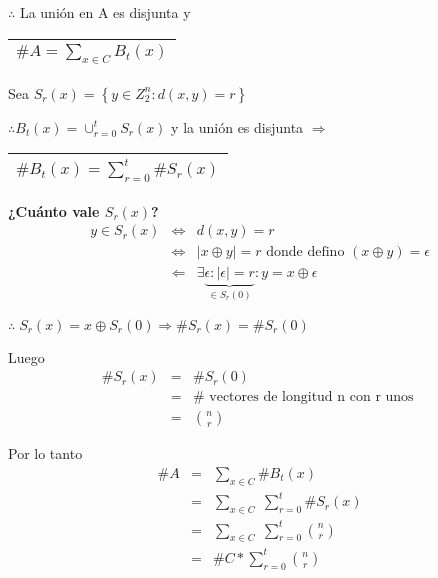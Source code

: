 \documentclass[12pt,a4paper]{report}
\begin{document}
			\begin{center}
				$\therefore$ La unión en A es disjunta y \begin{tabular}{|c|} \hline $ \#A = \sum_{x \in C} B_{t}(x) $ \\ \hline \end{tabular}
			\end{center}

			\vspace{3mm}
			\par Sea $S_{r}(x) = \left\lbrace y \in Z_{2}^{n} : d(x, y) = r \right\rbrace$

			\vspace{3mm}
			\par $\therefore B_{t}(x) = \cup_{r = 0}^{t}S_{r}(x)$ y la unión es disjunta $\Rightarrow$ \begin{tabular}{|c|} \hline $ \#B_{t}(x) = \sum_{r = 0}^{t}\#S_{r}(x) $ \\ \hline \end{tabular}

			\vspace{3mm}
			\textbf{¿Cuánto vale $S_{r}(x)$?}
			\begin{eqnarray}
				\nonumber y \in S_{r}(x) & \Leftrightarrow & d(x, y) = r \\
				\nonumber & \Leftrightarrow & \lvert x \oplus y \rvert = r \text{ donde defino } (x \oplus y) = \epsilon \\
				\nonumber & \Leftarrow & \exists \underbrace{\epsilon : \lvert \epsilon \rvert = r}_{\in S_{r}(0)} : y = x \oplus \epsilon
			\end{eqnarray}
			\par $\therefore \; S_{r}(x) = x \oplus S_{r}(0) \Rightarrow \#S_{r}(x) = \#S_{r}(0)$

			\vspace{3mm}
			\par Luego
			\begin{eqnarray}
				\nonumber \#S_{r}(x) &=& \#S_{r}(0) \\
				\nonumber &=& \# \text{ vectores de longitud n con r unos } \\
				\nonumber &=& {n \choose r}
			\end{eqnarray}

			\par Por lo tanto
			\begin{eqnarray}
				\nonumber \# A &=& \sum_{x \in C} \# B_{t}(x) \\
				\nonumber &=& \sum_{x \in C} \; \sum_{r= 0}^{t} \#S_{r}(x) \\
				\nonumber &=& \sum_{x \in C} \; \sum_{r = 0}^{t} {n \choose r} \\
				\nonumber &=& \# C * \sum_{r = 0}^{t} {n \choose r}
			\end{eqnarray}
\end{document}
